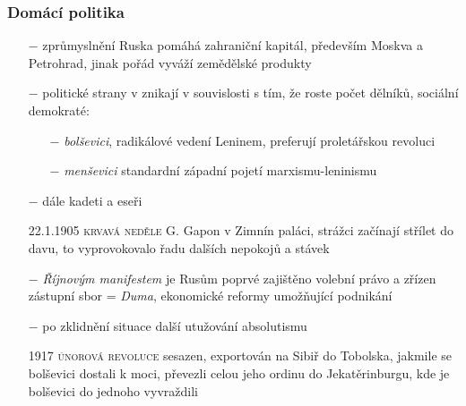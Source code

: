 \documentclass{article}
\begin{document}
\subsubsection*{Domácí politika}
\begin{itemize}
    \vspace{-0.5em}
    \setlength\itemsep{0.15em}
    \item[$-$] zprůmyslnění Ruska pomáhá zahraniční kapitál, především Moskva a Petrohrad, jinak pořád vyváží zemědělské produkty
    \item[$-$] politické strany v znikají v souvislosti s tím, že roste počet dělníků, sociální demokraté:
    \begin{itemize}
        \vspace{-0.5em}
        \setlength\itemsep{0.15em}
        \item[$-$] \textit{bolševici}, radikálové vedení Leninem, preferují proletářskou revoluci
        \item[$-$] \textit{menševici} standardní západní pojetí marxismu-leninismu
    \end{itemize}
    \item[$-$] dále kadeti a eseři
    \item[22.1.1905] \textsc{krvavá neděle} G. Gapon v Zimnín paláci, strážci začínají střílet do davu, to vyprovokovalo řadu dalších nepokojů a stávek
    \item[$-$] \textit{Říjnovým manifestem} je Rusům poprvé zajištěno volební právo a zřízen zástupní sbor = \textit{Duma}, ekonomické reformy umožňující podnikání
    \item[$-$] po zklidnění situace další utužování absolutismu
    \item[1917] \textsc{únorová revoluce} sesazen, exportován na Sibiř do Tobolska, jakmile se bolševici dostali k moci, převezli celou jeho ordinu do Jekatěrinburgu, kde je bolševici do jednoho vyvraždili
\end{itemize}
\end{document}
